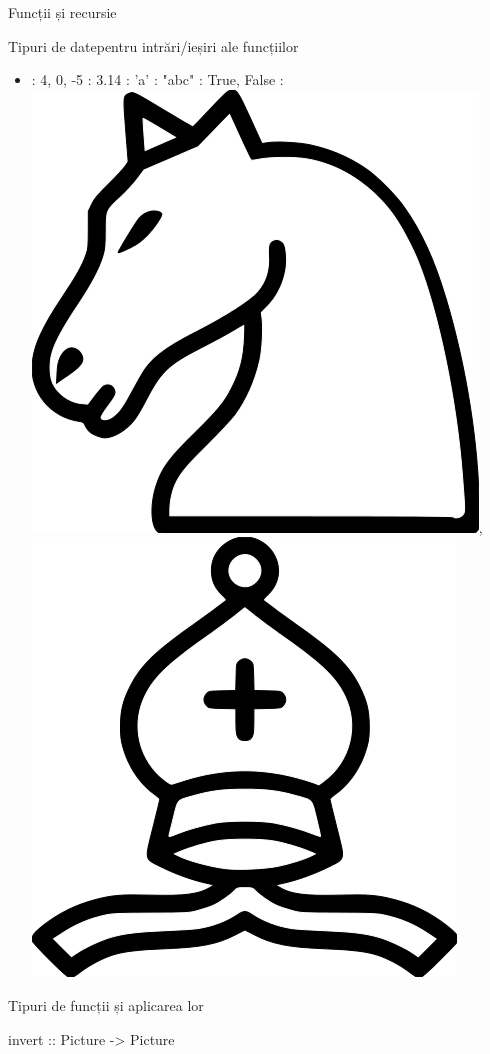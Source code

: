 \documentclass[xcolor=pdftex,romanian,colorlinks]{beamer}
\begin{document}
\begin{section}{Funcții și recursie}
\begin{frame}{Tipuri de date}{pentru intrări/ieșiri ale funcțiilor}
\begin{itemize}
\item {}:  4, 0, -5
\vitem {}: 3.14
\vitem {}: 'a'
\vitem {}: "abc"
\vitem {}: True, False
 : \includegraphics[scale=.05, valign=t]{knight.png}, \includegraphics[scale=.05, valign=t]{bishop.png}
\end{itemize}
\end{frame}
\tikzset{>=latex} 
\begin{frame}[fragile]{Tipuri de funcții și aplicarea lor}
\begin{asciihs}
invert :: Picture -> Picture


\end{asciihs}
\end{frame}
\end{section}
\end{document}
